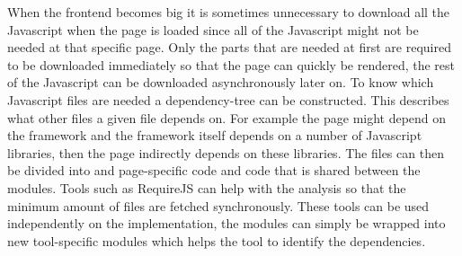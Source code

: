 When the frontend becomes big it is sometimes unnecessary to download all the Javascript when the page is loaded since all of the Javascript might not be needed at that specific page. Only the parts that are needed at first are required to be downloaded immediately so that the page can quickly be rendered, the rest of the Javascript can be downloaded asynchronously later on. To know which Javascript files are needed a dependency-tree can be constructed. This describes what other files a given file depends on. For example the page might depend on the framework and the framework itself depends on a number of Javascript libraries, then the page indirectly depends on these libraries. The files can then be divided into and page-specific code and code that is shared between the modules. Tools such as RequireJS can help with the analysis so that the minimum amount of files are fetched synchronously. These tools can be used independently on the implementation, the modules can simply be wrapped into new tool-specific modules which helps the tool to identify the dependencies.
